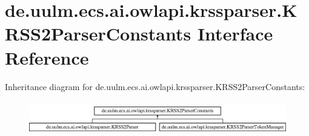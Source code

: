 \hypertarget{interfacede_1_1uulm_1_1ecs_1_1ai_1_1owlapi_1_1krssparser_1_1_k_r_s_s2_parser_constants}{\section{de.\-uulm.\-ecs.\-ai.\-owlapi.\-krssparser.\-K\-R\-S\-S2\-Parser\-Constants Interface Reference}
\label{interfacede_1_1uulm_1_1ecs_1_1ai_1_1owlapi_1_1krssparser_1_1_k_r_s_s2_parser_constants}
}
Inheritance diagram for de.\-uulm.\-ecs.\-ai.\-owlapi.\-krssparser.\-K\-R\-S\-S2\-Parser\-Constants\-:\begin{figure}[H]
\begin{center}
\leavevmode
\includegraphics[height=1.505376cm]{interfacede_1_1uulm_1_1ecs_1_1ai_1_1owlapi_1_1krssparser_1_1_k_r_s_s2_parser_constants}
\end{center}
\end{figure}
